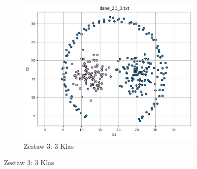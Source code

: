\documentclass[polish,12pt,a4paper]{extarticle}
\begin{document}
\begin{figure}[h!]
\begin{subfigure}[b]{0.30\textwidth}
    \end{subfigure}
    \hfill
    \begin{subfigure}[b]{0.30\textwidth}
        \includegraphics[width=\linewidth]{img/spectral/singular/data3.png}
        \captionsetup{labelformat=empty}
        \caption{Zestaw 3: 3 Klas}
    \end{subfigure}
\end{figure}
\end{document}
